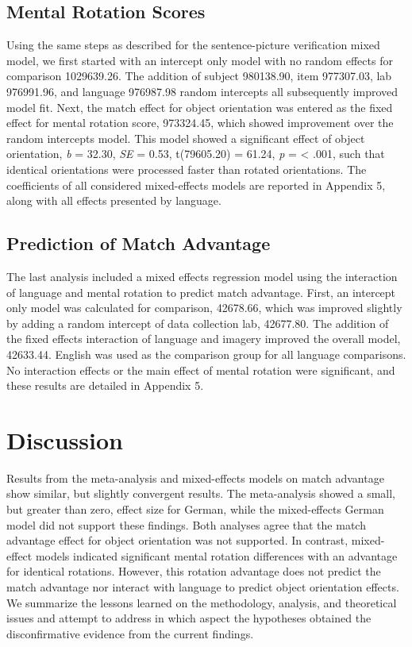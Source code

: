 \documentclass[
  man]{apa7}
\begin{document}
\hypertarget{mental-rotation-scores}{%
\subsection{Mental Rotation Scores}\label{mental-rotation-scores}}

Using the same steps as described for the sentence-picture verification mixed model, we first started with an intercept only model with no random effects for comparison 1029639.26. The addition of subject 980138.90, item 977307.03, lab 976991.96, and language 976987.98 random intercepts all subsequently improved model fit. Next, the match effect for object orientation was entered as the fixed effect for mental rotation score, 973324.45, which showed improvement over the random intercepts model. This model showed a significant effect of object orientation, \emph{b} = 32.30, \emph{SE} = 0.53, t(79605.20) = 61.24, \emph{p} = \textless{} .001, such that identical orientations were processed faster than rotated orientations. The coefficients of all considered mixed-effects models are reported in Appendix 5, along with all effects presented by language.

\hypertarget{prediction-of-match-advantage}{%
\subsection{Prediction of Match Advantage}\label{prediction-of-match-advantage}}

The last analysis included a mixed effects regression model using the interaction of language and mental rotation to predict match advantage. First, an intercept only model was calculated for comparison, 42678.66, which was improved slightly by adding a random intercept of data collection lab, 42677.80. The addition of the fixed effects interaction of language and imagery improved the overall model, 42633.44. English was used as the comparison group for all language comparisons. No interaction effects or the main effect of mental rotation were significant, and these results are detailed in Appendix 5.

\hypertarget{discussion}{%
\section{Discussion}\label{discussion}}

Results from the meta-analysis and mixed-effects models on match advantage show similar, but slightly convergent results. The meta-analysis showed a small, but greater than zero, effect size for German, while the mixed-effects German model did not support these findings. Both analyses agree that the match advantage effect for object orientation was not supported. In contrast, mixed-effect models indicated significant mental rotation differences with an advantage for identical rotations. However, this rotation advantage does not predict the match advantage nor interact with language to predict object orientation effects. We summarize the lessons learned on the methodology, analysis, and theoretical issues and attempt to address in which aspect the hypotheses obtained the disconfirmative evidence from the current findings.
\end{document}
